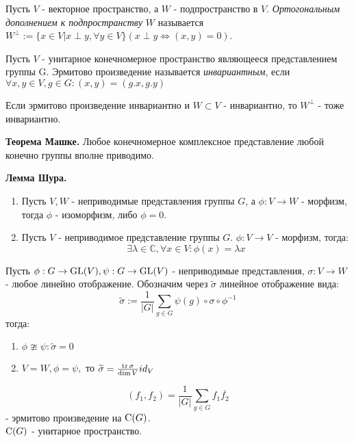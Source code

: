 \begin{defi}
Пусть $V$ - векторное пространство, а $W$ - подпространство в $V$. \textit{Ортогональным дополнением к подпространству} $W$ называется ${W^{\perp}:=\{x\in V|x\perp y,\forall y\in V\}(x\perp y \Leftrightarrow (x,y) = 0)}$.
\end{defi}

\begin{defi}
Пусть $V$ - унитарное конечномерное пространство являющееся представлением группы G. Эрмитово произведение называется \textit{инвариантным}, если $\forall x,y\in V,g\in G:(x,y)=(g.x,g.y)$
\end{defi}

\begin{ass}
Если эрмитово произведение инвариантно и $W\subset V$ - инвариантно, то $W^{\perp}$ - тоже инвариантно.
\end{ass}

\begin{thm}
\textbf{Теорема Машке.} Любое конечномерное комплексное представление любой конечно группы вполне приводимо.
\end{thm}

\begin{lemma}
\textbf{Лемма Шура.} \begin{enumerate}
  \item Пусть $V,W$ - неприводимые представления группы $G$, а $\phi:V\to W$ - морфизм, тогда $\phi$ - изоморфизм, либо $\phi=0$.
  \item Пусть $V$ - неприводимое представление группы $G$. $\phi:V\to V$ - морфизм, тогда: $$\exists\lambda\in\mathbb{C},\forall x\in V:\phi(x)= \lambda x$$
\end{enumerate}
\end{lemma}

\begin{ass}
Пусть $\phi:G\to\operatorname{GL}(V),\psi:G\to\operatorname{GL}(V)$ - неприводимые представления, $\sigma:V\to W$ - любое линейно отображение. Обозначим через $\widetilde{\sigma}$ линейное отображение вида:
$$\widetilde{\sigma}:=\frac{1}{|G|}\sum_{g\in G} \psi(g)\circ\sigma\circ\phi^{-1}$$
тогда:
\begin{enumerate}
  \item $\phi\ncong\psi:\widetilde{\sigma}=0$
  \item $V=W,\phi=\psi,$ то $\widetilde{\sigma} = \frac{\operatorname{tr}\sigma}{\dim V}id_V$
\end{enumerate}
\end{ass}

\begin{ass}
$$(f_1,f_2) = \frac{1}{|G|}\sum_{g\in G}f_1 \overline{f_2}$$ - эрмитово произведение на $\operatorname{C}(G)$. \\$\operatorname{C}(G)$ - унитарное пространство.
\end{ass}

